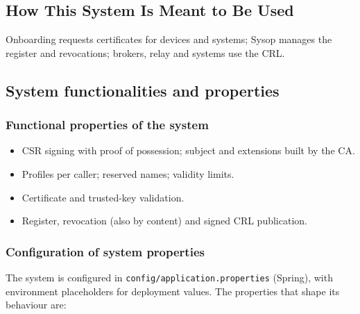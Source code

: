 \documentclass[a4paper]{arrowhead}
\begin{document}
\subsection{How This System Is Meant to Be Used}
\label{sec:use}

Onboarding requests certificates for devices and systems; Sysop manages the register and revocations; brokers, relay and systems use the CRL.

\subsection{System functionalities and properties}
\label{sec:properties}

\subsubsection{Functional properties of the system}

\begin{itemize}
  \item CSR signing with proof of possession; subject and extensions built by the CA.
  \item Profiles per caller; reserved names; validity limits.
  \item Certificate and trusted-key validation.
  \item Register, revocation (also by content) and signed CRL publication.
\end{itemize}

\subsubsection{Configuration of system properties}

The system is configured in \texttt{config/\allowbreak{}application.\allowbreak{}properties} (Spring), with environment placeholders for deployment values. The properties that shape its behaviour are:
\end{document}
